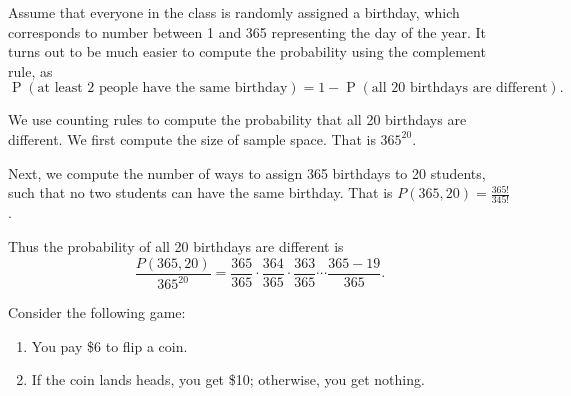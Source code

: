 \documentclass[answers,11pt]{exam}
\DeclareMathOperator*{\Prob}{P}
\renewcommand{\Pr}{\Prob}
\begin{document}
\begin{questions}
\begin{solution}
Assume that everyone in the class is randomly assigned a birthday, which
corresponds to number between 1 and 365 representing the day of the year.
It turns out to be much easier to compute the probability using the complement
rule, as
\[
  \Pr(\text{at least 2 people have the same birthday})
  = 1 - \Pr(\text{all 20 birthdays are different}).
\]

We use counting rules to compute the probability that all 20 birthdays are different. 
We first compute the size of sample space. That is $365^{20}$.

Next, we compute the number of ways to assign 365 birthdays to 20 students, such that no two students can have the same birthday.
That is $P(365,20)=\frac{365!}{345!}$.

Thus the probability of all 20 birthdays are different is
$$\frac{P(365,20)}{365^{20}} = \frac{365}{365}\cdot \frac{364}{365}\cdot\frac{363}{365}\cdots \frac{365-19}{365}.$$

\end{solution}


\newpage
{}

\question \label{ques:rv-coinflip-game} Consider the following game:
\begin{enumerate}
\item You pay \$6 to flip a coin.
\item If the coin lands heads, you get \$10; otherwise, you get nothing.
\end{enumerate}

\end{questions}
\end{document}

